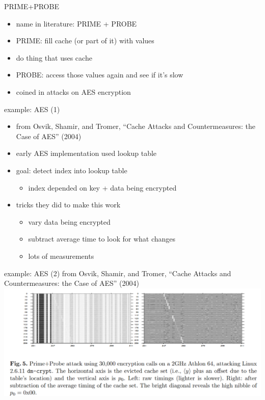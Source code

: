\begin{frame}{PRIME+PROBE}
    \begin{itemize}
    \item name in literature: PRIME + PROBE
    \item PRIME: fill cache (or part of it) with values
    \item do thing that uses cache
    \item PROBE: access those values again and see if it's slow
    \vspace{.5cm}
    \item coined in attacks on AES encryption
    \end{itemize}
\end{frame}

\begin{frame}{example: AES (1)}
\begin{itemize}
\item from Osvik, Shamir, and Tromer, ``Cache Attacks and Countermeasures: the Case of AES'' (2004)
\item early AES implementation used lookup table
\item goal: detect index into lookup table
    \begin{itemize}
    \item index depended on key + data being encrypted
    \end{itemize}
\item tricks they did to make this work
    \begin{itemize}
    \item vary data being encrypted
    \item subtract average time to look for what changes
    \item lots of measurements
    \end{itemize}
\end{itemize}
\end{frame}

\begin{frame}{example: AES (2)}
\small from Osvik, Shamir, and Tromer, ``Cache Attacks and Countermeasures: the Case of AES'' (2004) \\
\includegraphics[width=1.0\textwidth]{../spectre/prime-probe-osvik}
\end{frame}
